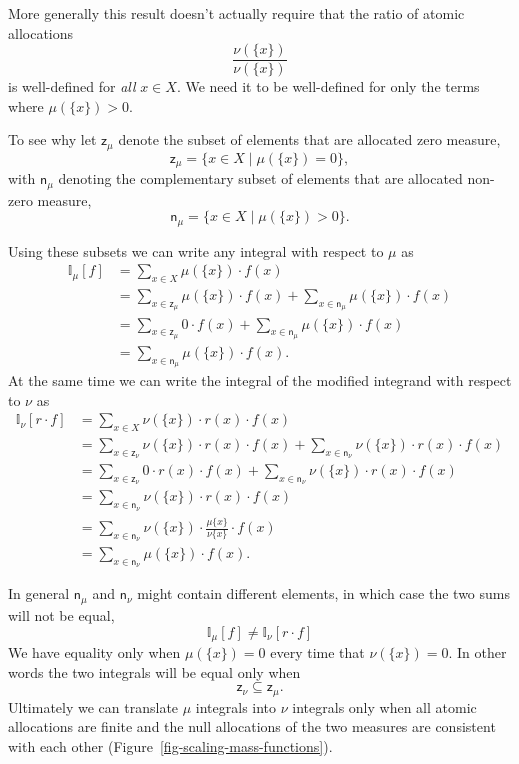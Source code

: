 \documentclass[
  letterpaper,
  DIV=11,
  numbers=noendperiod]{scrartcl}
\begin{document}
More generally this result doesn't actually require that the ratio of
atomic allocations \[
\frac{ \nu(  \{ x \} ) }{ \nu( \{ x \} ) }
\] is well-defined for \emph{all} \(x \in X\). We need it to be
well-defined for only the terms where \(\mu( \{ x \} ) > 0\).

To see why let \(\mathsf{z}_{\mu}\) denote the subset of elements that
are allocated zero measure, \[
\mathsf{z}_{\mu} = \{ x \in X \mid \mu( \{ x \} ) = 0 \},
\] with \(\mathsf{n}_{\mu}\) denoting the complementary subset of
elements that are allocated non-zero measure, \[
\mathsf{n}_{\mu} = \{ x \in X \mid \mu( \{ x \} ) > 0 \}.
\]

Using these subsets we can write any integral with respect to \(\mu\) as
\begin{align*}
\mathbb{I}_{\mu}[f]
&=
\sum_{x \in X} \mu( \{ x \} ) \cdot f(x)
\\
&=
  \sum_{x \in \mathsf{z}_{\mu}} \mu( \{ x \} ) \cdot f(x)
+ \sum_{x \in \mathsf{n}_{\mu}} \mu( \{ x \} ) \cdot f(x)
\\
&=
  \sum_{x \in \mathsf{z}_{\mu}} 0 \cdot f(x)
+ \sum_{x \in \mathsf{n}_{\mu}} \mu( \{ x \} ) \cdot f(x)
\\
&=
\sum_{x \in \mathsf{n}_{\mu}} \mu( \{ x \} ) \cdot f(x).
\end{align*} At the same time we can write the integral of the modified
integrand with respect to \(\nu\) as \begin{align*}
\mathbb{I}_{\nu} [ r \cdot f ]
&=
\sum_{x \in X} \nu( \{ x \} ) \cdot r(x) \cdot f(x)
\\
&=
  \sum_{x \in \mathsf{z}_{\nu}} \nu( \{ x \} ) \cdot r(x) \cdot f(x)
+ \sum_{x \in \mathsf{n}_{\nu}} \nu( \{ x \} ) \cdot r(x) \cdot f(x)
\\
&=
  \sum_{x \in \mathsf{z}_{\nu}} 0 \cdot r(x) \cdot f(x)
+ \sum_{x \in \mathsf{n}_{\nu}} \nu( \{ x \} ) \cdot r(x) \cdot f(x)
\\
&=
\sum_{x \in \mathsf{n}_{\nu}} \nu( \{ x \} ) \cdot r(x) \cdot f(x)
\\
&=
\sum_{x \in \mathsf{n}_{\nu}} \nu( \{ x \} ) \cdot
\frac{ \mu \{ x \} }{ \nu \{ x \} } \cdot f(x)
\\
&=
\sum_{x \in \mathsf{n}_{\nu}} \mu( \{ x \} ) \cdot f(x).
\end{align*}

In general \(\mathsf{n}_{\mu}\) and \(\mathsf{n}_{\nu}\) might contain
different elements, in which case the two sums will not be equal, \[
\mathbb{I}_{\mu}[f] \ne
\mathbb{I}_{\nu}
\left[ r \cdot f \right]
\] We have equality only when \(\mu( \{ x \} ) = 0\) every time that
\(\nu( \{ x \} ) = 0\). In other words the two integrals will be equal
only when \[
\mathsf{z}_{\nu} \subseteq \mathsf{z}_{\mu}.
\] Ultimately we can translate \(\mu\) integrals into \(\nu\) integrals
only when all atomic allocations are finite and the null allocations of
the two measures are consistent with each other
(Figure~\ref{fig-scaling-mass-functions}).
\end{document}
